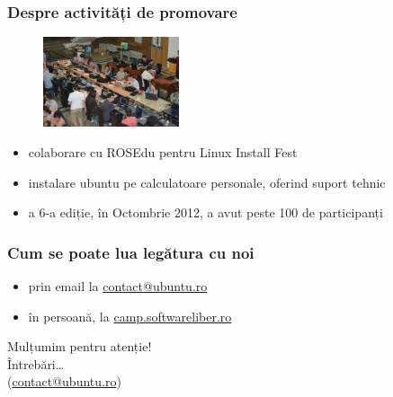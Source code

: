 \documentclass[compress]{beamer}
\begin{document}
\begin{frame}
\frametitle{Despre activități de promovare}

\begin{figure}[ht]
    \includegraphics[width=4cm]{./res/lif2012.jpg} %
\end{figure} 
\begin{itemize}[<+->]
  \item colaborare cu ROSEdu pentru Linux Install Fest
  \item instalare ubuntu pe calculatoare personale, oferind suport tehnic
  \item a 6-a ediție, în Octombrie 2012, a avut peste 100 de participanți
\end{itemize}
\end{frame}

\begin{frame}
\frametitle{Cum se poate lua legătura cu noi}

\begin{itemize}[<+->]
  \item prin email la \href{mailto://contact@ubuntu.ro}{contact@ubuntu.ro}
  \item în persoană, la \href{http://camp.softwareliber.ro/}{camp.softwareliber.ro}
\end{itemize}
\end{frame}

\begin{frame}
  \begin{center}
    \huge
    Mulțumim pentru atenție!
    \\
    Întrebări\ldots
    \\
    (\href{mailto://contact@ubuntu.ro}{contact@ubuntu.ro})
  \end{center}
\end{frame}
\end{document}
